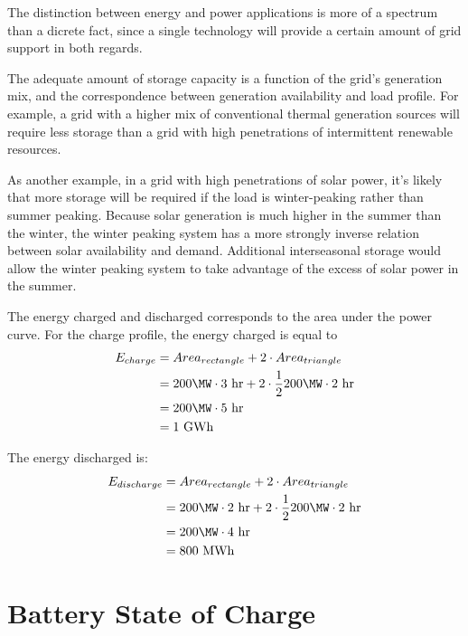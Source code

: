 \documentclass{homework}
\begin{document}
\begin{letterenum}
    The distinction between energy and power applications is more of a spectrum
    than a dicrete fact, since a single technology will provide a certain amount
    of grid support in both regards.

\item The adequate amount of storage capacity is a function of the grid's
    generation mix, and the correspondence between generation availability and
    load profile. For example, a grid with
    a higher mix of conventional thermal generation sources will require 
    less storage than a grid with high penetrations of intermittent
    renewable resources.

    As another example, in a grid with high penetrations of solar power,
    it's likely that more storage will be required if the load is winter-peaking
    rather than summer peaking. Because solar generation is much higher in the summer
    than the winter, the winter peaking system has a more strongly inverse relation
    between solar availability and demand. Additional interseasonal storage would
    allow the winter peaking system to take advantage of the excess of solar power
    in the summer.

\newcommand{\hr}{\text{ hr}}
\newcommand{\GWh}{\text{ GWh}}
\newcommand{\MWh}{\text{ MWh}}
\item The energy charged and discharged corresponds to the area under the
    power curve. For the charge profile, the energy charged is equal to
    \begin{align*}
        E_{charge} &= Area_{rectangle} + 2 \cdot Area_{triangle} \\
            &= 200 \MW \cdot 3 \hr + 2 \cdot \frac{1}{2} 200 \MW \cdot 2 \hr \\
            &= 200 \MW \cdot 5 \hr \\
            &= 1 \GWh
    \end{align*}

    The energy discharged is:
    \begin{align*}
        E_{discharge} &= Area_{rectangle} + 2 \cdot Area_{triangle} \\
            &= 200 \MW \cdot 2 \hr + 2 \cdot \frac{1}{2} 200 \MW \cdot 2 \hr \\
            &= 200 \MW \cdot 4 \hr \\
            &= 800 \MWh
    \end{align*}
\end{letterenum}

\section{Battery State of Charge}
\end{document}
